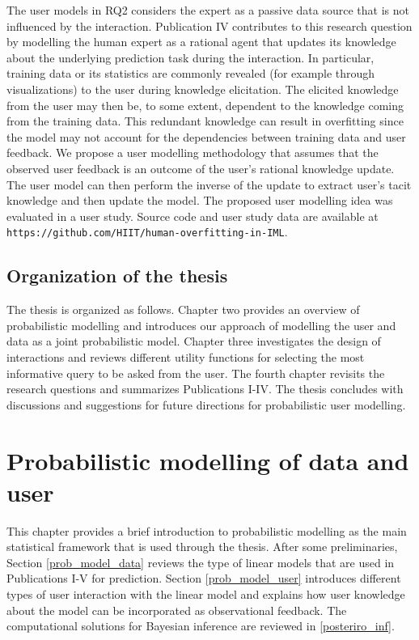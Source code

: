 \documentclass[dissertation,math,vertlayout,pdfa,colorlinks]{aaltoseries}
\begin{document}
The user models in RQ2 considers the expert as a passive data source that is not influenced by the interaction. Publication IV contributes to this research question by modelling the human expert as a rational agent that updates its knowledge about the underlying prediction task during the interaction. In particular, training data or its statistics are commonly revealed (for example through visualizations) to the user during knowledge elicitation. The elicited knowledge from the user may then be, to some extent, dependent to the knowledge coming from the training data. This redundant knowledge can  result in overfitting since the model may not account for the dependencies between training data and user feedback. We propose a user modelling methodology that assumes that the observed user feedback is an outcome of the user's rational knowledge update. The user model can then perform the inverse of the update to extract user's tacit knowledge and then update the model. The proposed user modelling idea was evaluated in a user study. 
Source code and user study data are available at \texttt{https://github.com/HIIT/human-overfitting-in-IML}.

\section{Organization of the thesis}

The thesis is organized as follows. Chapter two provides an overview of probabilistic modelling and introduces our approach of modelling the user and data as a joint probabilistic model. Chapter three investigates the design of interactions and reviews different utility functions for selecting the most informative query to be asked from the user. The fourth chapter revisits the research questions and summarizes Publications I-IV. The thesis concludes with discussions and suggestions for future directions for probabilistic user modelling.



\chapter{Probabilistic modelling of data and user} \label{prob_model_data_user}


This chapter provides a brief introduction to probabilistic modelling as the main statistical framework that is used through the thesis. After some preliminaries,  Section \ref{prob_model_data} reviews the type of linear models that are used in Publications I-V for prediction. Section \ref{prob_model_user} introduces different types of user interaction with the linear model and explains how user knowledge about the model can be incorporated as observational feedback. The computational solutions for Bayesian inference are reviewed in \ref{posteriro_inf}. %
\end{document}
